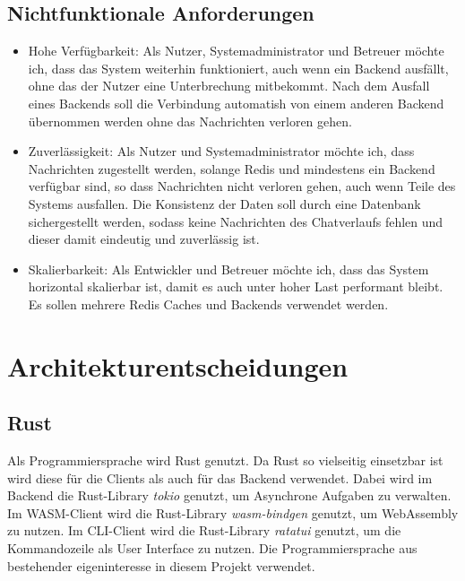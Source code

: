\subsection{Nichtfunktionale Anforderungen}
\begin{itemize}
  \item Hohe Verfügbarkeit: Als Nutzer, Systemadministrator und Betreuer möchte ich, dass das System weiterhin funktioniert, auch wenn ein Backend ausfällt, ohne das der Nutzer eine Unterbrechung mitbekommt. Nach dem Ausfall eines Backends soll die Verbindung automatish von einem anderen Backend übernommen werden ohne das Nachrichten verloren gehen.
  \item Zuverlässigkeit: Als Nutzer und Systemadministrator möchte ich, dass Nachrichten zugestellt werden, solange Redis und mindestens ein Backend verfügbar sind, so dass Nachrichten nicht verloren gehen, auch wenn Teile des Systems ausfallen. Die Konsistenz der Daten soll durch eine Datenbank sichergestellt werden, sodass keine Nachrichten des Chatverlaufs fehlen und dieser damit eindeutig und zuverlässig ist.
  \item Skalierbarkeit: Als Entwickler und Betreuer möchte ich, dass das System horizontal skalierbar ist, damit es auch unter hoher Last performant bleibt. Es sollen mehrere Redis Caches und Backends verwendet werden.
\end{itemize}

\section{Architekturentscheidungen}

\subsection{Rust}
Als Programmiersprache wird Rust genutzt.
Da Rust so vielseitig einsetzbar ist wird diese für die Clients als auch für das Backend verwendet.
Dabei wird im Backend die Rust-Library \textit{tokio} genutzt, um Asynchrone Aufgaben zu verwalten.
Im \ac{WASM}-Client wird die Rust-Library \textit{wasm-bindgen} genutzt, um WebAssembly zu nutzen.
Im \ac{CLI}-Client wird die Rust-Library \textit{ratatui} genutzt, um die Kommandozeile als User Interface zu nutzen.
Die Programmiersprache aus bestehender eigeninteresse in diesem Projekt verwendet.

